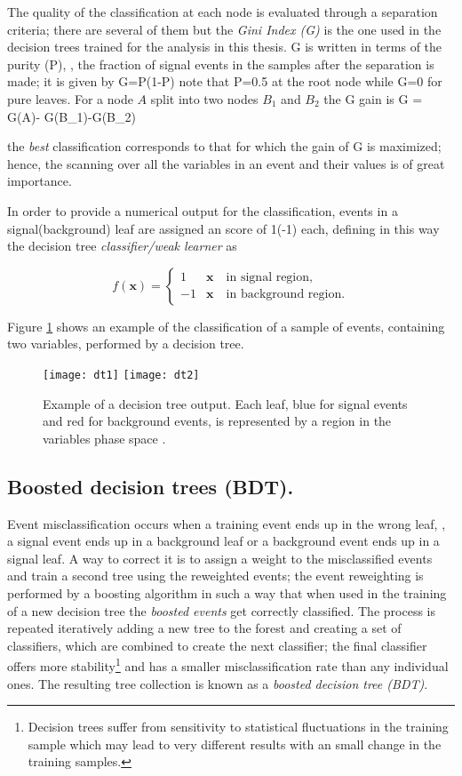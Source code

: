 The quality of the classification at each node is evaluated through a separation criteria; there are several of them but the \textit{Gini Index (G)} is the one used in the decision trees trained for the analysis in this thesis. G is written in terms of the purity (P), \ie, the fraction of signal events in the samples after the separation is made; it is given by
\beqn
G=P(1-P)
\eeqn
\noindent note that P=0.5 at the root node while G=0 for pure leaves. For a node $A$ split into two nodes $B_1$ and $B_2$ the G gain is
\beqn
\Delta G = G(A)- G(B_1)-G(B_2)
\eeqn

\noindent the \textit{best} classification corresponds to that for which the gain of G is maximized; hence, the scanning over all the variables in an event and their values is of great importance.

In order to provide a numerical output for the classification, events in a signal(background) leaf are assigned an score of 1(-1) each, defining in this way the decision tree \textit{classifier/weak learner} as

\[
f(\textbf{x}) = \left\{
\begin{array}{ll}
  1  &  \textbf{x} \quad \textrm{in signal region,}\\
  -1 &  \textbf{x} \quad \textrm{in background region.}
\end{array}
\right.
\]

Figure \ref{fig:dtr} shows an example of the classification of a sample of events, containing two variables, performed by a decision tree.

\begin{figure}[!h]
  \centering
  \texttt{[image: dt1]}
  \texttt{[image: dt2]}
  \caption[Decision tree output example.]{Example of a decision tree output. Each leaf, blue for signal events and red for background events, is represented by a region in the variables phase space \cite{coadou}.}\label{fig:dtr}
\end{figure}

\subsection{Boosted decision trees (BDT).}

Event misclassification occurs when a training event ends up in the wrong leaf, \ie, a signal event ends up in a background leaf or a background event ends up in a signal leaf. A way to correct it is to assign a weight to the misclassified events and train a second tree using the reweighted events; the event reweighting is performed by a boosting algorithm in such a way that when used in the training of a new decision tree  the \textit{boosted events} get correctly classified. The process is repeated iteratively adding a new tree to the forest and creating a set of classifiers, which are combined to create the next classifier; the final classifier offers more stability\footnote{Decision trees suffer from sensitivity to statistical fluctuations in the training sample which may lead to very different results with an small change in the training samples.} and has a smaller misclassification rate than any individual ones. The resulting tree collection is known as a \textit{boosted decision tree (BDT)}.

